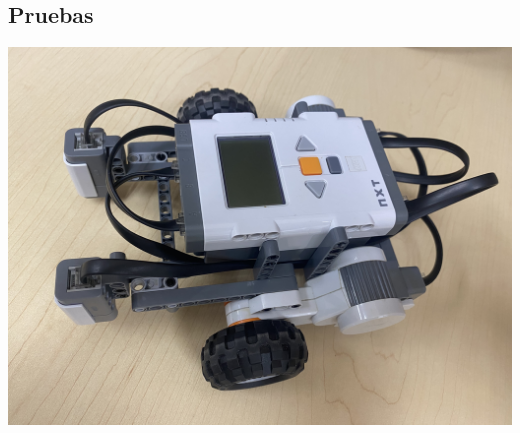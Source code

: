 \documentclass[oneside,twocolumn]{article}
\begin{document}
\subsection{Pruebas}


\includegraphics[scale=0.09]{graficos/robot.png}
\end{document}
